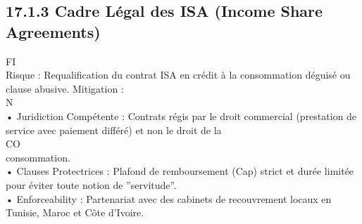 \documentclass[12pt,landscape,a4paper]{article}
\begin{document}
\subsection{17.1.3 Cadre Légal des ISA (Income Share Agreements)}
\vspace{0.5em}
\vspace{0.5em}
\vspace{0.5em}
\vspace{0.5em}
FI\\
Risque : Requalification du contrat ISA en crédit à la consommation déguisé ou clause abusive. Mitigation :\\
\vspace{0.5em}
N\\
• Juridiction Compétente : Contrats régis par le droit commercial (prestation de service avec paiement différé) et non le droit de la\\
CO\\
consommation.\\
\vspace{0.5em}
• Clauses Protectrices : Plafond de remboursement (Cap) strict et durée limitée pour éviter toute notion de ”servitude”.\\
\vspace{0.5em}
• Enforceability : Partenariat avec des cabinets de recouvrement locaux en Tunisie, Maroc et Côte d’Ivoire.\\
\vspace{0.5em}
\vspace{0.5em}
\end{document}
